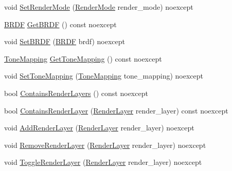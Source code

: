 \begin{DoxyCompactItemize}
\item 
void \hyperlink{classmage_1_1rendering_1_1_camera_settings_aa4f29b081141c0acfb0e4d92eac81602}{Set\+Render\+Mode} (\hyperlink{namespacemage_1_1rendering_aeb14ce7610cc9391f4e01be027b91dcc}{Render\+Mode} render\+\_\+mode) noexcept
\item 
\hyperlink{namespacemage_1_1rendering_ab8fe8684ca4bd74ba3a394b00cf125b5}{B\+R\+DF} \hyperlink{classmage_1_1rendering_1_1_camera_settings_a3cb398b3bd69ae3a81e2e4c415d9e195}{Get\+B\+R\+DF} () const noexcept
\item 
void \hyperlink{classmage_1_1rendering_1_1_camera_settings_af2af3e55e876b0e2b037904e221f0bc4}{Set\+B\+R\+DF} (\hyperlink{namespacemage_1_1rendering_ab8fe8684ca4bd74ba3a394b00cf125b5}{B\+R\+DF} brdf) noexcept
\item 
\hyperlink{namespacemage_1_1rendering_a789e4b7d9a8cc831b065e9c6bb7430e9}{Tone\+Mapping} \hyperlink{classmage_1_1rendering_1_1_camera_settings_ae127ec7aa6c836b747d947200f847254}{Get\+Tone\+Mapping} () const noexcept
\item 
void \hyperlink{classmage_1_1rendering_1_1_camera_settings_ab5dc52d8f8d92cf3c4f6aca126f6dc47}{Set\+Tone\+Mapping} (\hyperlink{namespacemage_1_1rendering_a789e4b7d9a8cc831b065e9c6bb7430e9}{Tone\+Mapping} tone\+\_\+mapping) noexcept
\item 
bool \hyperlink{classmage_1_1rendering_1_1_camera_settings_aa6a33e3b5936e440af32d2ca3d65585f}{Contains\+Render\+Layers} () const noexcept
\item 
bool \hyperlink{classmage_1_1rendering_1_1_camera_settings_aab59f8b20a5d05fd23fff006ef741dac}{Contains\+Render\+Layer} (\hyperlink{namespacemage_1_1rendering_a466c2a441ea5b26e4625c2f34e021b3d}{Render\+Layer} render\+\_\+layer) const noexcept
\item 
void \hyperlink{classmage_1_1rendering_1_1_camera_settings_a921ff9ebe3ff05890f0e3dd8b71fcb7f}{Add\+Render\+Layer} (\hyperlink{namespacemage_1_1rendering_a466c2a441ea5b26e4625c2f34e021b3d}{Render\+Layer} render\+\_\+layer) noexcept
\item 
void \hyperlink{classmage_1_1rendering_1_1_camera_settings_a49c766f4880c798a90a9b8fe488a6711}{Remove\+Render\+Layer} (\hyperlink{namespacemage_1_1rendering_a466c2a441ea5b26e4625c2f34e021b3d}{Render\+Layer} render\+\_\+layer) noexcept
\item 
void \hyperlink{classmage_1_1rendering_1_1_camera_settings_a95c531aba7bbddba9ea47000de3c53b2}{Toggle\+Render\+Layer} (\hyperlink{namespacemage_1_1rendering_a466c2a441ea5b26e4625c2f34e021b3d}{Render\+Layer} render\+\_\+layer) noexcept

\end{DoxyCompactItemize}
